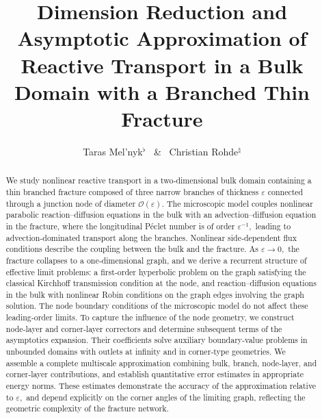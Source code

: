 \documentclass[reqno]{amsart}            %
\numberwithin{equation}{section}
\begin{document}
	
	\title[Reactive Transport in a Bulk Domain with a Branched Thin Fracture]
	{Dimension Reduction and Asymptotic Approximation of Reactive Transport in a Bulk Domain with a Branched Thin Fracture}
	
	
	\author[Taras Mel'nyk \ \& \ Christian Rohde]{Taras Mel'nyk$^\flat$ \  \& \ Christian Rohde$^\natural$  }
	\address{\hskip-12pt  $^\flat$ 
		1) \, Institute of Applied Analysis and Numerical Simulation,
		Faculty of Mathematics and Physics, Stuttgart University\\
		Pfaffenwaldring 57,\ 70569 Stuttgart,  \ Germany,\\
		\ \ 2)
		Department of Mathematical Physics, Faculty of Mathematics and Mechanics\\
		Taras Shevchenko National University of Kyiv\\
		Volodymyrska str. 64,\ 01601 Kyiv,  \ Ukraine
	}
	
	
	\address{\hskip-12pt  $^\natural$ Institute of Applied Analysis and Numerical Simulation,
		Faculty of Mathematics and Physics, Stuttgart University\\
		Pfaffenwaldring 57,\ 70569 Stuttgart,  \ Germany
	}
	
	
	\begin{abstract}
	We study nonlinear reactive transport in a two‑dimensional bulk domain containing a thin branched fracture composed of three narrow branches of thickness $\varepsilon$ connected through a junction node of diameter $\mathcal{O}(\varepsilon).$ The microscopic model couples nonlinear parabolic reaction–diffusion equations in the bulk with an advection–diffusion equation in the fracture, where the longitudinal Péclet number is of order $\varepsilon^{-1},$ leading to advection‑dominated transport along the branches. Nonlinear side‑dependent flux conditions describe the coupling between the bulk and the fracture. As $\varepsilon \to 0,$ 
	the fracture collapses to a one‑dimensional graph, and we derive a recurrent structure of effective limit problems: a first‑order hyperbolic problem on the graph satisfying the classical Kirchhoff transmission condition at the node, and reaction–diffusion equations in the bulk with nonlinear Robin conditions on the graph edges involving the graph solution. 
	The node boundary conditions of the microscopic model do not affect these leading‑order limits. To capture the influence of the node geometry, we construct node‑layer and corner‑layer correctors and determine subsequent terms of the asymptotics expansion. Their coefficients solve auxiliary boundary‑value problems in unbounded domains with outlets at infinity and in corner‑type geometries. 
	We assemble a complete multiscale approximation combining bulk, branch, node‑layer, and corner‑layer contributions, and establish quantitative error estimates in appropriate energy norms. These estimates demonstrate the accuracy of the approximation relative to 
	$\varepsilon,$ and depend explicitly on the corner angles of the limiting graph, reflecting the geometric complexity of the fracture network.
	\end{abstract}
		
\end{document}
